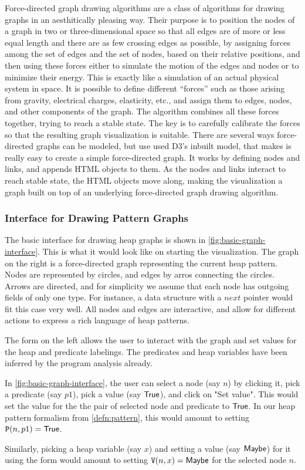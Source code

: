 Force-directed graph drawing algorithms are a class of algorithms for drawing graphs in an aesthitically pleasing way. Their purpose is to position the nodes of a graph in two or three-dimensional space so that all edges are of more or less equal length and there are as few crossing edges as possible, by assigning forces among the set of edges and the set of nodes, based on their relative positions, and then using these forces either to simulate the motion of the edges and nodes or to minimize their energy. This is exactly like a simulation of an actual physical system in space. It is possible to define different ``forces'' such as those arising from gravity, electrical charges, elasticity, etc., and assign them to edges, nodes, and other components of the graph. The algorithm combines all these forces together, trying to reach a stable state. The key is to carefully calibrate the forces so that the resulting graph visualization is suitable. There are several ways force-directed graphs can be modeled, but use used D3's inbuilt model, that makes is really easy to create a simple force-directed graph. It works by defining nodes and links, and appends HTML objects to them. As the nodes and links interact to reach stable state, the HTML objects move along, making the visualization a graph built on top of an underlying force-directed graph drawing algorithm.

\subsubsection{Interface for Drawing Pattern Graphs}

The basic interface for drawing heap graphs is shown in \autoref{fig:basic-graph-interface}. This is what it would look like on starting the visualization. The graph on the right is a force-directed graph representing the current heap pattern. Nodes are represented by circles, and edges by arros connecting the circles. Arrows are directed, and for simplicity we assume that each node has outgoing fields of only one type. For instance, a data structure with a $next$ pointer would fit this case very well. All nodes and edges are interactive, and allow for different actions to express a rich language of heap patterns.

The form on the left allows the user to interact with the graph and set values for the heap and predicate labelings. The predicates and heap variables have been inferred by the program analysis already.

\begin{ex}
\label{ex:basic-graph-interface}
In \autoref{fig:basic-graph-interface}, the user can select a node (say $n$) by clicking it, pick a predicate (say $p1$), pick a value (say $\mathsf{True}$), and click on "Set value". This would set the value for the the pair of selected node and predicate to $\mathsf{True}$. In our heap pattern formalism from \autoref{defn:pattern}, this would amount to setting $\mathtt{P}(n, p1) = \mathsf{True}$.

Similarly, picking a heap variable (say $x$) and setting a value (say $\mathsf{Maybe}$) for it using the form would amount to setting $\mathtt{V}(n,x) = \mathsf{Maybe}$ for the selected node $n$.
\end{ex}

